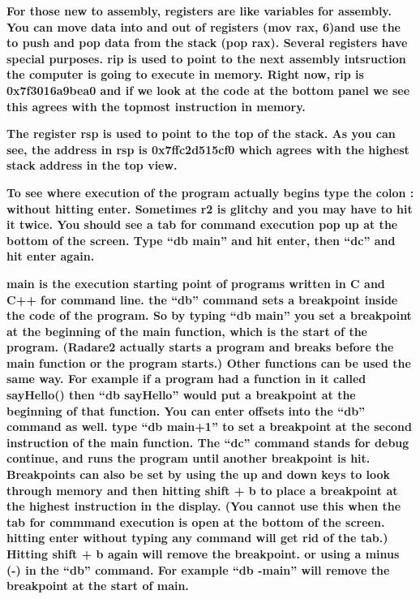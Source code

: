 \documentclass[letterpaper]{article}
\newcommand{\sitfig}[3]{
\begin{figure}[H]
\centering
\makebox[\textwidth][c]{
#2
}
\label{#1}
\end{figure}
}
\newcommand{\sitgfx}[4][scale=1.0]{
\sitfig{#3}{\texttt{[image: \#2]}}{#4}
}
\begin{document}
  
\sitgfx[width=5.8335in,height=3.6457in]{FINALWORKINGDOCFORMERLYPRECURSOR-img027.png}{fig:unk}{TODO CAPTION}
 

\textbf{For those new to assembly, registers are like variables for assembly. You can move data into and out of
registers (mov rax, 6)and use the to push and pop data from the stack (pop rax). Several registers have special
purposes. rip is used to point to the next assembly intsruction the computer is going to execute in memory. Right now,
rip is 0x7f3016a9bea0 and if we look at the code at the bottom panel we see this agrees with the topmost instruction in
memory.}

  
\sitgfx[width=5.8335in,height=3.6457in]{FINALWORKINGDOCFORMERLYPRECURSOR-img078.png}{fig:unk}{TODO CAPTION}
 

\textbf{The register rsp is used to point to the top of the stack. As you can see, the address in rsp is 0x7ffc2d515cf0
which agrees with the highest stack address in the top view.}

  
\sitgfx[width=5.8335in,height=3.6457in]{FINALWORKINGDOCFORMERLYPRECURSOR-img079.png}{fig:unk}{TODO CAPTION}
 

\textbf{To see where execution of the program actually begins type the colon : without hitting enter. Sometimes r2 is
glitchy and you may have to hit it twice. You should see a tab for command execution pop up at the bottom of the
screen. Type ``db main'' and hit enter, then ``dc'' and hit enter again.}

  
\sitgfx[width=5.8335in,height=3.6457in]{FINALWORKINGDOCFORMERLYPRECURSOR-img080.png}{fig:unk}{TODO CAPTION}
 

\textbf{main is the execution starting point of programs written in C and C++ for command line. the ``db'' command sets
a breakpoint inside the code of the program. So by typing ``db main'' you set a breakpoint at the beginning of the main
function, which is the start of the program. (Radare2 actually starts a program and breaks before the main function or
the program starts.) Other functions can be used the same way. For example if a program had a function in it called
sayHello() then ``db sayHello'' would put a breakpoint at the beginning of that function. You can enter offsets into
the ``db'' command as well. type ``db main+1'' to set a breakpoint at the second instruction of the main function. The
``dc'' command stands for debug continue, and runs the program until another breakpoint is hit. Breakpoints can also be
set by using the up and down keys to look through memory and then hitting shift + b to place a breakpoint at the
highest instruction in the display. (You cannot use this when the tab for commmand execution is open at the bottom of
the screen. hitting enter without typing any command will get rid of the tab.) Hitting shift + b again will remove the
breakpoint. or using a minus (-) in the ``db'' command. For example ``db -main'' will remove the breakpoint at the
start of main.}
\end{document}
